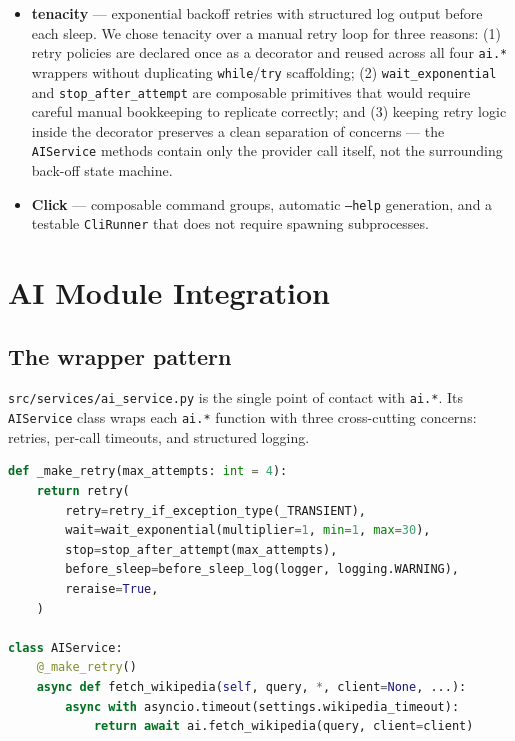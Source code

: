 \documentclass[12pt,a4paper]{article}
\begin{document}
\begin{itemize}
    not mid-request.
  \item \textbf{tenacity} — exponential backoff retries with structured log output before each
    sleep. We chose tenacity over a manual retry loop for three reasons: (1) retry policies
    are declared once as a decorator and reused across all four \texttt{ai.*} wrappers without
    duplicating \texttt{while}/\texttt{try} scaffolding; (2) \texttt{wait\_exponential} and
    \texttt{stop\_after\_attempt} are composable primitives that would require careful manual
    bookkeeping to replicate correctly; and (3) keeping retry logic inside the decorator
    preserves a clean separation of concerns — the \texttt{AIService} methods contain only
    the provider call itself, not the surrounding back-off state machine.
  \item \textbf{Click} — composable command groups, automatic \texttt{--help} generation, and a
    testable \texttt{CliRunner} that does not require spawning subprocesses.
\end{itemize}

\section{AI Module Integration}

\subsection{The wrapper pattern}

\texttt{src/services/ai\_service.py} is the single point of contact with \texttt{ai.*}.
Its \texttt{AIService} class wraps each \texttt{ai.*} function with three cross-cutting concerns:
retries, per-call timeouts, and structured logging.

\begin{lstlisting}[language=Python, caption=Retry decorator factory in ai\_service.py]
def _make_retry(max_attempts: int = 4):
    return retry(
        retry=retry_if_exception_type(_TRANSIENT),
        wait=wait_exponential(multiplier=1, min=1, max=30),
        stop=stop_after_attempt(max_attempts),
        before_sleep=before_sleep_log(logger, logging.WARNING),
        reraise=True,
    )

class AIService:
    @_make_retry()
    async def fetch_wikipedia(self, query, *, client=None, ...):
        async with asyncio.timeout(settings.wikipedia_timeout):
            return await ai.fetch_wikipedia(query, client=client)
\end{lstlisting}
\end{document}
